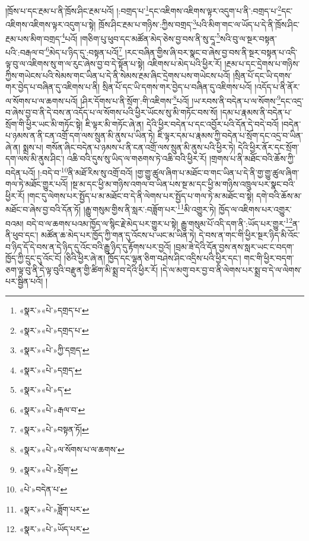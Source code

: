།ཁྲོས་པ་དང་རྔམ་པ་ནི་ཁྲོས་ཤིང་རྔམ་པའོ། །:བགྲད་པ་\footnote{«སྣར་»«པེ་»དགྲད་པ་}དང་འཇིགས་འཇིགས་ལྟར་འདུག་པ་ནི་:བགྲད་པ་\footnote{«སྣར་»«པེ་»དགྲད་པ་}དང་འཇིགས་འཇིགས་ལྟར་འདུག་པ་སྟེ། ཁྲོས་ཤིང་རྔམ་པ་གཉིས་:ཀྱིས་བགྲད་\footnote{«སྣར་»«པེ་»ཀྱི་དགྲད་}པའི་མིག་གང་ལ་ཡོད་པ་དེ་ནི་ཁྲོས་ཤིང་རྔམ་པས་མིག་བགྲད་\footnote{«སྣར་»«པེ་»དགྲད་}པའོ། །གཅིག་པུ་ཕུབ་དང་མཚོན་མེད་ཅེས་བྱ་བས་ནི་སུ་དཱ་\footnote{«སྣར་»«པེ་»ད་}སའི་བུ་ལ་སྔར་བསྟན་པའི་:བརྒལ་བ་\footnote{«སྣར་»«པེ་»རྒལ་བ་}མེད་པ་ཉིད་དུ་:བསྟན་པའོ།\footnote{«སྣར་»«པེ་»བསྟན་ཏོ།} །རང་བཞིན་གྱིས་ཞི་བར་སྣང་བ་ཞེས་བྱ་བས་ནི་སྔར་བསྟན་པ་འདི་ལྟ་བུ་ལ་འཇིགས་སུ་ག་ལ་རུང་ཞེས་བྱ་བ་དེ་སྟོན་པ་སྟེ། འཇིགས་པ་མེད་པའི་ཕྱིར་རོ། །རྔམ་པ་དང་དྲེགས་པ་གཉིས་ཀྱིས་གཡེངས་པའི་སེམས་གང་ཡིན་པ་དེ་ནི་སེམས་རྔམ་ཞིང་དྲེགས་པས་གཡེངས་པའོ། །སྲིན་པོ་དང་ཡི་དགས་གར་བྱེད་པ་བཞིན་དུ་འཇིགས་པ་ནི། སྲིན་པོ་དང་ཡི་དགས་གར་བྱེད་པ་བཞིན་དུ་འཇིགས་པའོ། །འདོད་པ་ནི་ནོར་ལ་སོགས་པ་ལ་ཆགས་པའོ། །ཤིར་དོགས་པ་ནི་སྲོག་:གི་འཇིགས་\footnote{«སྣར་»«པེ་»ལ་སོགས་པ་ལ་ཆགས་}པའོ། །ཡ་རབས་ནི་བདེན་པ་ལ་སོགས་\footnote{«སྣར་»«པེ་»སྲོག་}དང་འདྲ་བ་ཞེས་བྱ་བ་ནི་དེ་བས་ན་འདོད་པ་ལ་སོགས་པའི་ཕྱིར་ཡོངས་སུ་མི་གཏོང་བས་སོ། །དམ་པ་རྣམས་ནི་བདེན་པ་སྲོག་གི་ཕྱིར་ཡང་མི་གཏོང་སྟེ། ཇི་ལྟར་མི་གཏོང་ཞེ་ན། དེའི་ཕྱིར་བདེན་པ་དང་འབྱོར་པའི་དོན་དེ་བདེ་བའོ། །བདེན་པ་ཉམས་ན་ནི་ངན་འགྲོ་དག་ལས་སྲུན་མི་ནུས་པ་ཡིན་ཏེ། ཇི་ལྟར་དམ་པ་རྣམས་ཀྱི་བདེན་པ་སྲོག་དང་འདྲ་བ་ཡིན་ཞེ་ན། སྨྲས་པ། གསོན་ཞིང་བདེན་པ་ཉམས་པ་ནི་ངན་འགྲོ་ལས་སྲུན་མི་ནུས་པའི་ཕྱིར་ཏེ། དེའི་ཕྱིར་ནོར་དང་སྲོག་དག་ལས་མི་ནུས་ཤིང་། འཆི་བའི་དུས་སུ་ཡིད་ལ་གཅགས་ཏེ་འཆི་བའི་ཕྱིར་རོ། །གྲགས་པ་ནི་མཐོང་བའི་ཆོས་ཀྱི་བདེན་པའོ། །:བདེ་བ་\footnote{«པེ་»བདེན་པ་}ནི་མཐོ་རིས་སུ་འགྲོ་བའོ། །གྱ་གྱུ་ཚུལ་ཞིག་པ་མཐོང་བ་གང་ཡིན་པ་དེ་ནི་གྱ་གྱུ་ཚུལ་ཞིག་གལ་ཏེ་མཐོང་གྱུར་པའོ། །སྔ་མ་དང་ཕྱི་མ་གཉིས་འགལ་བ་ཡིན་པས་སྔ་མ་དང་ཕྱི་མ་གཉིས་འཁྲུལ་པར་སྣང་བའི་ཕྱིར་རོ། །གང་དུ་ལེགས་པར་སྤྱོད་པ་མ་མཐོང་བ་དེ་ནི་ལེགས་པར་སྤྱོད་པ་གལ་ཏེ་མ་མཐོང་བ་སྟེ། དགེ་བའི་ཆོས་མ་མཐོང་བ་ཞེས་བྱ་བའི་དོན་ཏོ། །རྒྱུ་གསུམ་གྱིས་ནི་སླར་:བཟློག་པར་\footnote{«སྣར་»«པེ་»ཟློག་པར་}མི་འགྱུར་ཏེ། ཁྱོད་ལ་འཇིགས་པར་འགྱུར་བའམ། བདེ་བ་ལ་ཆགས་པའམ་ཁྱོད་ལ་སྙིང་རྗེ་མེད་པར་གྱུར་པ་སྟེ། རྒྱུ་གསུམ་པོ་འདི་དག་ནི་:ཡོད་པར་གྱུར་\footnote{«སྣར་»«པེ་»ཡོད་པར་}ན་ནི་ཕུབ་དང་། མཚོན་ཆ་མེད་པར་ཁྱོད་ཀྱི་གན་དུ་འོངས་པ་ཡང་མ་ཡིན་ཏེ། དེ་བས་ན་གང་གི་ཕྱིར་སྔར་ཉིད་མི་འོང་བ་ཉིད་དོ་དེ་བས་ན་དེ་ཉིད་དུ་འོང་བའི་རྒྱུ་ཉིད་དུ་རྟོགས་པར་བྱའོ། །བྲམ་ཟེ་དེའི་དོན་བྱས་ནས་སླར་ཡང་ང་བདག་ཁྱོད་ཀྱི་དྲུང་དུ་འོང་ངོ། །ཅིའི་ཕྱིར་ཞེ་ན། ཁྱོད་དང་ལྷན་ཅིག་བཤེས་ཤིང་འདྲིས་པའི་ཕྱིར་དང་། གང་གི་ཕྱིར་བདག་ཅག་ལྟ་བུ་ནི་དེ་ལྟ་བུའི་བརྫུན་གྱི་ཚིག་མི་སྨྲ་བ་དེའི་ཕྱིར་རོ། །དེ་ལ་མགུ་བར་བྱ་བ་ནི་ལེགས་པར་སྨྲ་བ་དེ་ལ་ལེགས་པར་སྦྱིན་པའོ། །

